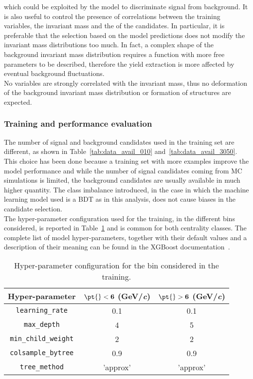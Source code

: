 which could be exploited by the model to discriminate signal from background. It is also useful to control the presence of 
correlations between the training variables, the invariant mass and the \pt of the candidates. 
In particular, it is preferable that the selection based on the model predictions does not modify the invariant mass distributions too much. 
In fact, a complex shape of the background invariant mass distribution requires a function with 
more free parameters to be described, therefore the yield extraction is more affected by eventual background fluctuations. \\
No variables are strongly correlated with the invariant mass, thus no deformation of the background invariant mass distribution or  
formation of structures are expected.

\subsubsection{Training and performance evaluation}
The number of signal and background candidates used in the training set are different, as shown in Table~\ref{tab:data_avail_010} 
and~\ref{tab:data_avail_3050}. This choice has been done because a training set with more examples improve the model 
performance and while the number of signal candidates coming from MC simulations is limited, the background candidates are usually  
available in much higher quantity. The class imbalance introduced, in the case in which the machine learning model used is a 
BDT as in this analysis, does not cause biases in the candidate selection. \\
The hyper-parameter configuration used for the training, in the different \pt{} bins considered, is reported in Table~\ref{tab:hyp_par} 
and is common for both centrality classes. The complete list of model hyper-parameters, together with their default values and a description 
of their meaning can be found in the XGBoost documentation~\cite{XGBdoc, XGBdefault}. 
\begin{table}[h!]
  \begin{center}
  \caption{Hyper-parameter configuration for the \pt{} bin considered in the training.}
  \label{tab:hyp_par}
    \begin{tabular}{|c|c|c|}
      \hline
      \textbf{Hyper-parameter} & \textbf{\(\mathbf{\pt{} < 6}\) (GeV/\textit{c})} & \textbf{\(\mathbf{\pt{} > 6}\) (GeV/\textit{c})} \\
      \hline
      \texttt{learning\_rate} & 0.1 & 0.1 \\
      \hline
      \texttt{max\_depth} & 4 & 5 \\
      \hline
      \texttt{min\_child\_weight} & 2 & 2 \\
      \hline
      \texttt{colsample\_bytree} & 0.9 & 0.9 \\
      \hline
      \texttt{tree\_method} & 'approx' & 'approx' \\
      \hline
    \end{tabular}
  \end{center}
\end{table}
